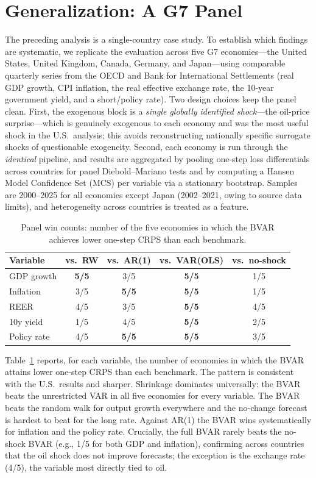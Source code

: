 \documentclass[conference]{IEEEtran}
\begin{document}
\section{Generalization: A G7 Panel}
The preceding analysis is a single-country case study. To establish which findings
are systematic, we replicate the evaluation across five G7 economies---the United
States, United Kingdom, Canada, Germany, and Japan---using comparable quarterly
series from the OECD and Bank for International Settlements (real GDP growth, CPI
inflation, the real effective exchange rate, the 10-year government yield, and a
short/policy rate). Two design choices keep the panel clean. First, the exogenous
block is a \emph{single globally identified shock}---the oil-price surprise---which
is genuinely exogenous to each economy and was the most useful shock in the U.S.\
analysis; this avoids reconstructing nationally specific surrogate shocks of
questionable exogeneity. Second, each economy is run through the \emph{identical}
pipeline, and results are aggregated by pooling one-step loss differentials across
countries for panel Diebold--Mariano tests and by computing a Hansen Model
Confidence Set (MCS) \cite{hansen2011} per variable via a stationary bootstrap.
Samples are 2000--2025 for all economies except Japan (2002--2021, owing to source
data limits), and heterogeneity across countries is treated as a feature.

\begin{table}[t]
\caption{Panel win counts: number of the five economies in which the BVAR achieves
lower one-step CRPS than each benchmark.}
\label{tab:panelwin}
\centering
\footnotesize
\setlength{\tabcolsep}{4pt}
\begin{tabular}{@{}lcccc@{}}
\toprule
Variable & vs.\ RW & vs.\ AR(1) & vs.\ VAR(OLS) & vs.\ no-shock \\
\midrule
GDP growth   & \textbf{5/5} & 3/5 & \textbf{5/5} & 1/5 \\
Inflation    & 3/5 & \textbf{5/5} & \textbf{5/5} & 1/5 \\
REER         & 4/5 & 3/5 & \textbf{5/5} & 4/5 \\
10y yield    & 1/5 & 4/5 & \textbf{5/5} & 2/5 \\
Policy rate  & 4/5 & \textbf{5/5} & \textbf{5/5} & 3/5 \\
\bottomrule
\end{tabular}
\end{table}

Table~\ref{tab:panelwin} reports, for each variable, the number of economies in
which the BVAR attains lower one-step CRPS than each benchmark. The pattern is
consistent with the U.S.\ results and sharper. Shrinkage dominates universally:
the BVAR beats the unrestricted VAR in all five economies for every variable. The
BVAR beats the random walk for output growth everywhere and the no-change forecast
is hardest to beat for the long rate. Against AR(1) the BVAR wins systematically
for inflation and the policy rate. Crucially, the full BVAR rarely beats the
no-shock BVAR (e.g., 1/5 for both GDP and inflation), confirming across countries
that the oil shock does not improve forecasts; the exception is the exchange rate
(4/5), the variable most directly tied to oil.
\end{document}
